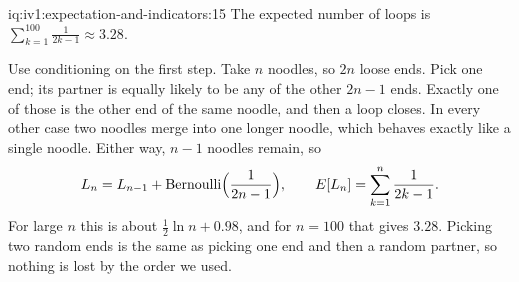 \begin{solution}{iq:iv1:expectation-and-indicators:15}
The expected number of loops is $\sum_{k=1}^{100} \frac{1}{2k-1} \approx 3.28$.

Use conditioning on the first step. Take $n$ noodles, so $2n$ loose ends. Pick one end; its partner is equally likely to be any of the
other $2n - 1$ ends. Exactly one of those is the other end of the same noodle, and then a loop closes. In every other case two noodles merge into
one longer noodle, which behaves exactly like a single noodle. Either way, $n - 1$ noodles remain, so
\[
L_n = L_{n-1} + \text{Bernoulli}\Bigl(\frac{1}{2n-1}\Bigr), \qquad E[L_n] = \sum_{k=1}^{n} \frac{1}{2k-1}.
\]
For large $n$ this is about $\tfrac12 \ln n + 0.98$, and for $n = 100$ that gives $3.28$. Picking two random ends is the same as picking one end
and then a random partner, so nothing is lost by the order we used.

\end{solution}

